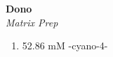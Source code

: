 \textbf{Dono} 
\\
\textit{Matrix Prep}
\begin{enumerate}
\item{52.86 mM \alpha-cyano-4-}
\end{enumerate}
